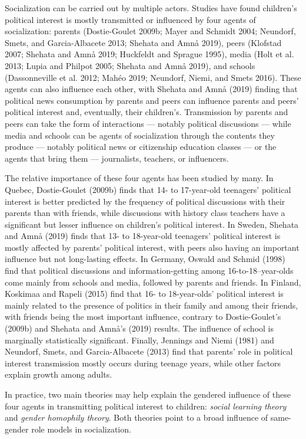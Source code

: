 \documentclass[
  letterpaper,
  DIV=11,
  numbers=noendperiod]{scrreprt}
\begin{document}
Socialization can be carried out by multiple actors. Studies have found
children's political interest is mostly transmitted or influenced by
four agents of socialization: parents (Dostie-Goulet 2009b; Mayer and
Schmidt 2004; Neundorf, Smets, and Garcia-Albacete 2013; Shehata and
Amnå 2019), peers (Klofstad 2007; Shehata and Amnå 2019; Huckfeldt and
Sprague 1995), media (Holt et al. 2013; Lupia and Philpot 2005; Shehata
and Amnå 2019), and schools (Dassonneville et al. 2012; Mahéo 2019;
Neundorf, Niemi, and Smets 2016). These agents can also influence each
other, with Shehata and Amnå (2019) finding that political news
consumption by parents and peers can influence parents and peers'
political interest and, eventually, their children's. Transmission by
parents and peers can take the form of interactions --- notably
political discussions --- while media and schools can be agents of
socialization through the contents they produce --- notably political
news or citizenship education classes --- or the agents that bring them
--- journalists, teachers, or influencers.

The relative importance of these four agents has been studied by many.
In Quebec, Dostie-Goulet (2009b) finds that 14- to 17-year-old
teenagers' political interest is better predicted by the frequency of
political discussions with their parents than with friends, while
discussions with history class teachers have a significant but lesser
influence on children's political interest. In Sweden, Shehata and Amnå
(2019) finds that 13- to 18-year-old teenagers' political interest is
mostly affected by parents' political interest, with peers also having
an important influence but not long-lasting effects. In Germany, Oswald
and Schmid (1998) find that political discussions and
information-getting among 16-to-18--year-olds come mainly from schools
and media, followed by parents and friends. In Finland, Koskimaa and
Rapeli (2015) find that 16- to 18-year-olds' political interest is
mainly related to the presence of politics in their family and among
their friends, with friends being the most important influence, contrary
to Dostie-Goulet's (2009b) and Shehata and Amnå's (2019) results. The
influence of school is marginally statistically significant. Finally,
Jennings and Niemi (1981) and Neundorf, Smets, and Garcia-Albacete
(2013) find that parents' role in political interest transmission mostly
occurs during teenage years, while other factors explain growth among
adults.

In practice, two main theories may help explain the gendered influence
of these four agents in transmitting political interest to children:
\emph{social learning theory} and \emph{gender homophily theory}. Both
theories point to a broad influence of same-gender role models in
socialization.
\end{document}
